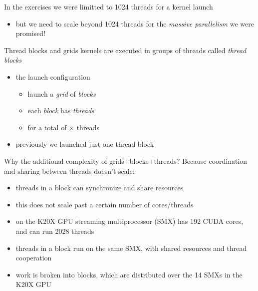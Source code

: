 
\begin{frame}[fragile]{}
    \begin{info}{}
        In the \axpy exercises we were limitted to 1024 threads for a kernel launch
        \begin{itemize}
            \item but we need to scale beyond 1024 threads for the \emph{massive parallelism} we were promised!
        \end{itemize}
    \end{info}

    \begin{info}{Thread blocks and grids}
        kernels are executed in groups of threads called \emph{thread blocks}
        \vspace{-12pt}
        \begin{itemize}
            \item the launch configuration 
            \begin{itemize}
                \item launch a \emph{grid} of  \emph{blocks}
                \item each \emph{block} has  \emph{threads}
                \item for a total of $\times$ threads
            \end{itemize}
            \item previously we launched just one thread block 
        \end{itemize}
    \end{info}

\end{frame}

\begin{frame}[fragile]{}
    \begin{info}{Why the additional complexity of grids+blocks+threads?}
        Because coordination and sharing between threads doesn't scale:
        \begin{itemize}
            \item threads in a block can synchronize and share resources
            \item this does not scale past a certain number of cores/threads
            \item on the K20X GPU streaming multiprocessor (SMX) has 192 CUDA cores, and can run 2028 threads
            \item threads in a block run on the same SMX, with shared resources and thread cooperation
            \item work is broken into blocks, which are distributed over the 14 SMXs in the K20X GPU
        \end{itemize}
    \end{info}
\end{frame}


